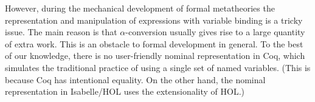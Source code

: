 \documentclass{svjour3}                     %
\begin{document}
However, during the mechanical development of formal metatheories the representation and manipulation of expressions with variable binding is a tricky issue. The main reason is that $\alpha$-conversion usually gives rise to a large quantity of extra work. This is an obstacle to formal development in general. To the best of our knowledge, there is no user-friendly nominal representation in Coq, which simulates the traditional practice of using a single set of named variables. (This is because Coq has intentional equality. On the other hand, the nominal representation in Isabelle/HOL uses the extensionality of HOL.)


\end{document}
